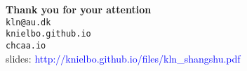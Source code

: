 \begin{frame}
	\begin{center}
		\textbf{Thank you for your attention}\\
			\medskip
		\texttt{kln@au.dk\\knielbo.github.io}\\
		\texttt{chcaa.io}\\
			\medskip
		slides: \textcolor{blue}{http://knielbo.github.io/files/kln\_shangshu.pdf}\\
	\end{center}
\end{frame}
